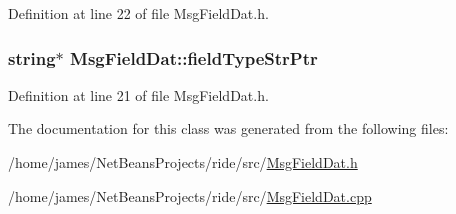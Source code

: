 Definition at line 22 of file Msg\-Field\-Dat.\-h.

\hypertarget{class_msg_field_dat_a14fd69763d364248df1f4f33ea5a3de6}{
\subsubsection[{field\-Type\-Str\-Ptr}]{\setlength{\rightskip}{0pt plus 5cm}string$\ast$ Msg\-Field\-Dat\-::field\-Type\-Str\-Ptr\hspace{0.3cm}{\ttfamily [private]}}}\label{class_msg_field_dat_a14fd69763d364248df1f4f33ea5a3de6}


Definition at line 21 of file Msg\-Field\-Dat.\-h.



The documentation for this class was generated from the following files\-:\begin{DoxyCompactItemize}
\item 
/home/james/\-Net\-Beans\-Projects/ride/src/\hyperlink{_msg_field_dat_8h}{Msg\-Field\-Dat.\-h}\item 
/home/james/\-Net\-Beans\-Projects/ride/src/\hyperlink{_msg_field_dat_8cpp}{Msg\-Field\-Dat.\-cpp}\end{DoxyCompactItemize}
